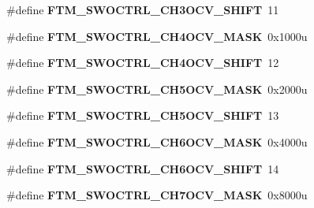 \begin{DoxyCompactItemize}
\item 
\#define {\bfseries F\+T\+M\+\_\+\+S\+W\+O\+C\+T\+R\+L\+\_\+\+C\+H3\+O\+C\+V\+\_\+\+S\+H\+I\+FT}~11\hypertarget{group__FTM__Register__Masks_gaf19ff618a9c962801b0aba2036e48ec8}{}\label{group__FTM__Register__Masks_gaf19ff618a9c962801b0aba2036e48ec8}

\item 
\#define {\bfseries F\+T\+M\+\_\+\+S\+W\+O\+C\+T\+R\+L\+\_\+\+C\+H4\+O\+C\+V\+\_\+\+M\+A\+SK}~0x1000u\hypertarget{group__FTM__Register__Masks_ga5cc982d14b624ca50169e1c98d02e4ff}{}\label{group__FTM__Register__Masks_ga5cc982d14b624ca50169e1c98d02e4ff}

\item 
\#define {\bfseries F\+T\+M\+\_\+\+S\+W\+O\+C\+T\+R\+L\+\_\+\+C\+H4\+O\+C\+V\+\_\+\+S\+H\+I\+FT}~12\hypertarget{group__FTM__Register__Masks_ga38757966eb256ada3ab6800fdde3574f}{}\label{group__FTM__Register__Masks_ga38757966eb256ada3ab6800fdde3574f}

\item 
\#define {\bfseries F\+T\+M\+\_\+\+S\+W\+O\+C\+T\+R\+L\+\_\+\+C\+H5\+O\+C\+V\+\_\+\+M\+A\+SK}~0x2000u\hypertarget{group__FTM__Register__Masks_ga15f2f2e7d6753053cffd4cd6a2de90e5}{}\label{group__FTM__Register__Masks_ga15f2f2e7d6753053cffd4cd6a2de90e5}

\item 
\#define {\bfseries F\+T\+M\+\_\+\+S\+W\+O\+C\+T\+R\+L\+\_\+\+C\+H5\+O\+C\+V\+\_\+\+S\+H\+I\+FT}~13\hypertarget{group__FTM__Register__Masks_gae269ab2d5353429a637b5ec4fabd55d8}{}\label{group__FTM__Register__Masks_gae269ab2d5353429a637b5ec4fabd55d8}

\item 
\#define {\bfseries F\+T\+M\+\_\+\+S\+W\+O\+C\+T\+R\+L\+\_\+\+C\+H6\+O\+C\+V\+\_\+\+M\+A\+SK}~0x4000u\hypertarget{group__FTM__Register__Masks_ga3b9f11da0d8d83fba974c4aaba2dac8a}{}\label{group__FTM__Register__Masks_ga3b9f11da0d8d83fba974c4aaba2dac8a}

\item 
\#define {\bfseries F\+T\+M\+\_\+\+S\+W\+O\+C\+T\+R\+L\+\_\+\+C\+H6\+O\+C\+V\+\_\+\+S\+H\+I\+FT}~14\hypertarget{group__FTM__Register__Masks_ga5f2de43ea7c9508165b8829009f2171f}{}\label{group__FTM__Register__Masks_ga5f2de43ea7c9508165b8829009f2171f}

\item 
\#define {\bfseries F\+T\+M\+\_\+\+S\+W\+O\+C\+T\+R\+L\+\_\+\+C\+H7\+O\+C\+V\+\_\+\+M\+A\+SK}~0x8000u\hypertarget{group__FTM__Register__Masks_gaeb2705f6572eaf6bcf1f868c8f70f6c2}{}\label{group__FTM__Register__Masks_gaeb2705f6572eaf6bcf1f868c8f70f6c2}


\end{DoxyCompactItemize}
